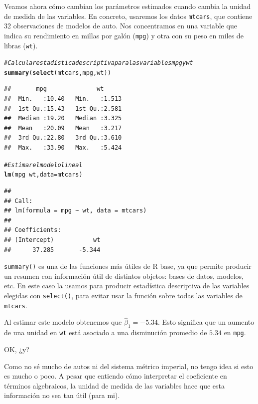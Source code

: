 \documentclass{report}\usepackage[]{graphicx}\usepackage[]{color}
\makeatletter
\newcommand{\hlcom}[1]{\textcolor[rgb]{0.678,0.584,0.686}{\textit{#1}}}%
\newcommand{\hlopt}[1]{\textcolor[rgb]{0,0,0}{#1}}%
\newcommand{\hlstd}[1]{\textcolor[rgb]{0.345,0.345,0.345}{#1}}%
\newcommand{\hlkwc}[1]{\textcolor[rgb]{0.333,0.667,0.333}{#1}}%
\newcommand{\hlkwd}[1]{\textcolor[rgb]{0.737,0.353,0.396}{\textbf{#1}}}%
\newenvironment{kframe}{%
 \def\at@end@of@kframe{}%
 \ifinner\ifhmode%
  \def\at@end@of@kframe{\end{minipage}}%
  \begin{minipage}{\columnwidth}%
 \fi\fi%
 \def\FrameCommand##1{\hskip\@totalleftmargin \hskip-\fboxsep
 \colorbox{shadecolor}{##1}\hskip-\fboxsep
     \hskip-\linewidth \hskip-\@totalleftmargin \hskip\columnwidth}%
 \MakeFramed {\advance\hsize-\width
   \@totalleftmargin\z@ \linewidth\hsize
   \@setminipage}}%
 {\par\unskip\endMakeFramed%
 \at@end@of@kframe}
\newenvironment{knitrout}{}{} %
\makeatother
\begin{document}
Veamos ahora cómo cambian los parámetros estimados cuando cambia la unidad de medida de las variables.
En concreto, usaremos los datos \verb|mtcars|, que contiene 32 observaciones de modelos de auto.
Nos concentramos en una variable que indica su rendimiento en millas por galón (\verb|mpg|) y otra con su peso en miles de libras (\verb|wt|).

\begin{knitrout}
\color{fgcolor}\begin{kframe}
\begin{alltt}
\hlcom{# Calcular estadística descriptiva para las variables mpg y wt}
\hlkwd{summary}\hlstd{(}\hlkwd{select}\hlstd{(mtcars, mpg, wt))}
\end{alltt}
\begin{verbatim}
##       mpg              wt       
##  Min.   :10.40   Min.   :1.513  
##  1st Qu.:15.43   1st Qu.:2.581  
##  Median :19.20   Median :3.325  
##  Mean   :20.09   Mean   :3.217  
##  3rd Qu.:22.80   3rd Qu.:3.610  
##  Max.   :33.90   Max.   :5.424
\end{verbatim}
\begin{alltt}
\hlcom{# Estimar el modelo lineal }
\hlkwd{lm}\hlstd{(mpg} \hlopt{~} \hlstd{wt,} \hlkwc{data} \hlstd{= mtcars)}
\end{alltt}
\begin{verbatim}
## 
## Call:
## lm(formula = mpg ~ wt, data = mtcars)
## 
## Coefficients:
## (Intercept)           wt  
##      37.285       -5.344
\end{verbatim}
\end{kframe}
\end{knitrout}




\begin{Rbox}
\verb|summary()| es una de las funciones más útiles de R base, ya que permite producir un resumen con información útil de distintos objetos: bases de datos, modelos, etc. En este caso la usamos para producir estadística descriptiva de las variables elegidas con \verb|select()|, para evitar usar la función sobre todas las variables de \verb|mtcars|.
\end{Rbox}

Al estimar este modelo obtenemos que $\hat\beta_1 = -5.34$. Esto significa que un aumento de una unidad en \verb|wt| está asociado a una disminución promedio de $5.34$ en \verb|mpg|.

OK, ¿y?

Como no sé mucho de autos ni del sistema métrico imperial, no tengo idea si esto es mucho o poco.
A pesar que entiendo cómo interpretar el coeficiente en términos algebraicos, la unidad de medida de las variables hace que esta información no sea tan útil (para mi).
\end{document}
